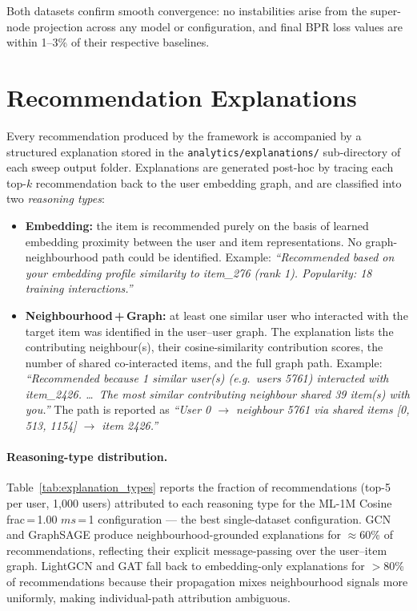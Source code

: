 Both datasets confirm smooth convergence: no instabilities arise from the super-node projection across any model or configuration, and final BPR loss values are within 1--3\% of their respective baselines.

\section{Recommendation Explanations}
\label{sec:explanations}

Every recommendation produced by the framework is accompanied by a structured explanation stored in the \texttt{analytics/explanations/} sub-directory of each sweep output folder. Explanations are generated post-hoc by tracing each top-$k$ recommendation back to the user embedding graph, and are classified into two \emph{reasoning types}:

\begin{itemize}
    \item \textbf{Embedding:} the item is recommended purely on the basis of learned embedding proximity between the user and item representations. No graph-neighbourhood path could be identified. Example: \textit{``Recommended based on your embedding profile similarity to item\_276 (rank 1). Popularity: 18 training interactions.''}

    \item \textbf{Neighbourhood\,+\,Graph:} at least one similar user who interacted with the target item was identified in the user--user graph. The explanation lists the contributing neighbour(s), their cosine-similarity contribution scores, the number of shared co-interacted items, and the full graph path. Example: \textit{``Recommended because 1 similar user(s) (e.g.\ users 5761) interacted with item\_2426. \ldots\ The most similar contributing neighbour shared 39 item(s) with you.''} The path is reported as \textit{``User 0 $\to$ neighbour 5761 via shared items [0, 513, 1154] $\to$ item 2426.''} 
\end{itemize}

\paragraph{Reasoning-type distribution.}
Table~\ref{tab:explanation_types} reports the fraction of recommendations (top-5 per user, 1{,}000 users) attributed to each reasoning type for the ML-1M Cosine frac\,=\,1.00 $ms$\,=\,1 configuration --- the best single-dataset configuration. GCN and GraphSAGE produce neighbourhood-grounded explanations for $\approx$60\% of recommendations, reflecting their explicit message-passing over the user--item graph. LightGCN and GAT fall back to embedding-only explanations for $>$80\% of recommendations because their propagation mixes neighbourhood signals more uniformly, making individual-path attribution ambiguous.

